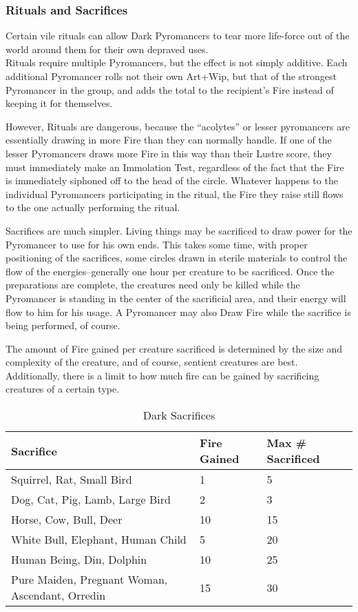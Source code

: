 \documentclass[oneside,11pt,english]{book}
\begin{document}
\subsubsection{Rituals and Sacrifices}
Certain vile rituals can allow Dark Pyromancers to tear more life-force out of
the world around them for their own depraved uses.\\
Rituals require multiple Pyromancers, but the effect is not simply additive.
Each additional Pyromancer rolls not their own Art+Wip, but that of the
strongest Pyromancer in the group, and adds the total to the recipient’s Fire
instead of keeping it for themselves.

However, Rituals are dangerous, because the “acolytes” or lesser pyromancers are
essentially drawing in more Fire than they can normally handle. If one of the
lesser Pyromancers draws more Fire in this way than their Lustre score, they
must immediately make an Immolation Test, regardless of the fact that the Fire
is immediately siphoned off to the head of the circle. Whatever happens to the
individual Pyromancers participating in the ritual, the Fire they raise still
flows to the one actually performing the ritual.

Sacrifices are much simpler. Living things may be sacrificed to draw power for
the Pyromancer to use for his own ends. This takes some time, with proper
positioning of the sacrifices, some circles drawn in sterile materials to
control the flow of the energies--generally one hour per creature to be
sacrificed. Once the preparations are complete, the creatures need only be
killed while the Pyromancer is standing in the center of the sacrificial area,
and their energy will flow to him for his usage. A Pyromancer may also Draw Fire
while the sacrifice is being performed, of course.

The amount of Fire gained per creature sacrificed is determined by the size and
complexity of the creature, and of course, sentient creatures are best.
Additionally, there is a limit to how much fire can be gained by sacrificing
creatures of a certain type.

\begin{table}[ht]
  \centering
  \caption{Dark Sacrifices}
  \label{tab:Dark Sacrifices}
  \begin{tabu} spread 0pt {X[2] *{2}{X[-1]}}
    Sacrifice                                       & Fire Gained & Max \# Sacrificed \\ \toprule
    Squirrel, Rat, Small Bird                       & 1           & 5                 \\
    Dog, Cat, Pig, Lamb, Large Bird                 & 2           & 3                 \\
    Horse, Cow, Bull, Deer                          & 10          & 15                \\
    White Bull, Elephant, Human Child               & 5           & 20                \\
    Human Being, Din, Dolphin                       & 10          & 25                \\
    Pure Maiden, Pregnant Woman, Ascendant, Orredin & 15          & 30                \\
  \end{tabu}
\end{table}
\end{document}
